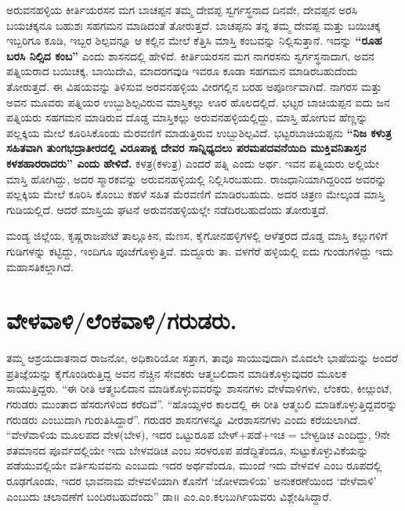 ಅರುವನಹಳ್ಳಿಯ ಕೀರ್ತಿಯರಸನ ಮಗ ಬಾಚಪ್ಪನ ತಮ್ಮ ದೇವಪ್ಪ ಸ್ವರ್ಗಸ್ಥನಾದ ದಿನವೇ, ದೇವಪ್ಪನ ಅರಸಿ ಬಯಚಕ್ಕನೂ ಬಹುಶಃ ಸಹಗಮನ ಮಾಡಿದಂತೆ ತೋರುತ್ತದೆ. ಬಾಚಪ್ಪನು ತನ್ನ ತಮ್ಮ ದೇವಪ್ಪ ಮತ್ತು ಬಯಿಚಕ್ಕ ಇಬ್ಬರಿಗೂ ಕೂಡಿ, ಇಬ್ಬರ ಶಿಲ್ಪವನ್ನೂ ಆ ಕಲ್ಲಿನ ಮೇಲೆ ಕೆತ್ತಿಸಿ ಮಾಸ್ತಿ ಕಂಬವನ್ನು ನಿಲ್ಲಿಸುತ್ತಾನೆ. ಇದನ್ನು \textbf{“ರೂಹ ಬರಸಿ ನಿಲ್ಸಿದ ಕಂಬ”} ಎಂದು ಶಾಸನದಲ್ಲಿ ಹೇಳಿದೆ. ಕೀರ್ತಿಯರಸನ ಮಗ ನಾಗರಸನು ಸ್ವರ್ಗಸ್ಥನಾದಾಗ, ಅವನ ಪತ್ನಿಯರಾದ ಬಯಿಚಕ್ಕ, ಬಾಯಿದೇವಿ, ಮಾದರಗವುಡಿ ಇವರೂ ಕೂಡಾ ಸಹಗಮನ ಮಾಡಿರಬಹುದೆಂದು ತೋರುತ್ತದೆ. ಈ ವಿಷಯವನ್ನು ತಿಳಿಸುವ ಅರವನಹಳ್ಳಿಯ ವೀರಗಲ್ಲಿನ ಬರಹ ಅಪೂರ್ಣವಾಗಿದೆ. ನಾಗರಸ ಮತ್ತು ಅವನ ಮೂವರು ಪತ್ನಿಯರ ಉಬ್ಬುಶಿಲ್ಪವಿರುವ ಮಾಸ್ತಿಕಲ್ಲು ಊರ ಹೊಲದಲ್ಲಿದೆ. ಭಟ್ಟರ ಬಾಚಿಯಪ್ಪನ ಐದು ಜನ ಪತ್ನಿಯರು ಸಹಗಮನ ಮಾಡಿರುವ ದೊಡ್ಡ ಮಾಸ್ತಿಕಲ್ಲು ಅರುವನಹಳ್ಳಿಯಲ್ಲಿದ್ದು, ಮಾಸ್ತಿ ಹೋಗುವ ಹೆಣ್ಣನ್ನು ಪಲ್ಲಕ್ಕಿಯ ಮೇಲೆ ಕೂರಿಸಿಕೊಂಡು ಮೆರವಣಿಗೆ ಮಾಡುತ್ತಿರುವ ಉಬ್ಬುಶಿಲ್ಪವಿದೆ. ಭಟ್ಟರಬಾಚಿಯಪ್ಪನು \textbf{“ನಿಜ ಕಳುತ್ರ ಸಹಿತವಾಗಿ ತುಂಗಭದ್ರಾತೀರದಲ್ಲಿ ವಿರೂಪಾಕ್ಷ ದೇವರ ಸಾನ್ನಿಧ್ಯದಲು ಪರಮಪದವನೆಯಿದಿ ಮುಕ್ತಿವನಿತಾಸ್ತನ ಕಳಶಹಾರರಾದರು” ಎಂದು ಹೇಳಿದೆ.} ಕಳತ್ರ(ಕಳುತ್ರ) ಎಂದರೆ ಪತ್ನಿ ಎಂದು ಅರ್ಥ. ಇವನ ಪತ್ನಿಯರು ಅಲ್ಲಿಯೇ ಮಾಸ್ತಿ ಹೋಗಿದ್ದು, ಅದರ ಸ್ಮಾರಕವನ್ನು ಅರುವನಹಳ್ಳಿಯಲ್ಲಿ ನಿಲ್ಲಿಸಿರಬಹುದು. ರಾಜಧಾನಿಯಾಗಿದ್ದರಿಂದ ಅವರನ್ನು ಪಲ್ಲಕ್ಕಿಯ ಮೇಲೆ ಕೂರಿಸಿ ಕೊಂಬು ಕಹಳೆ ಸಹಿತ ಮೆರವಣಿಗೆ ಮಾಡಿರಬಹುದು. ಅದರ ಚಿತ್ರಣ ಮೇಲ್ಕಂಡ ಮಾಸ್ತಿ ಗುಡಿಯಲ್ಲಿದೆ. ಆದರೆ ಮಾಸ್ತಿಯ ಘಟನೆ ಅರುವನಹಳ್ಳಿಯಲ್ಲೇ ನಡೆದಿರಬಹುದೆಂದು ತೋರುತ್ತದೆ.

ಮಂಡ್ಯ ಜಿಲ್ಲೆಯ, ಕೃಷ್ಣರಾಜಪೇಟೆ ತಾಲ್ಲೂಕಿನ, ಮೆಣಸ, ಕೈಗೋನಹಳ್ಳಿಗಳಲ್ಲಿ ಆಳೆತ್ತರದ ದೊಡ್ಡ ಮಾಸ್ತಿ ಕಲ್ಲುಗಳಿಗೆ ಗುಡಿಗಳನ್ನು ಕಟ್ಟಿದ್ದು, ಇಂದಿಗೂ ಪೂಜೆಗೊಳ್ಳುತ್ತಿವೆ. ಮದ್ದೂರು ತಾ. ವಳಗೆರೆ ಹಳ್ಳಿಯಲ್ಲಿ ಐದು ಗುಂಡುಗಳಿದ್ದು ಇದು ಮಹಾಸತಿಕಲ್ಲಾಗಿದೆ.


\section*{ವೇಳವಾಳಿ/ಲೆಂಕವಾಳಿ/ಗರುಡರು.}

ತಮ್ಮ ಆಶ್ರಯದಾತನಾದ ರಾಜನೋ, ಅಧಿಕಾರಿಯೋ ಸತ್ತಾಗ, ತಾವೂ ಸಾಯುವುದಾಗಿ ಮೊದಲೇ ಭಾಷೆಯನ್ನು ಅಂದರೆ ಪ್ರತಿಜ್ಞೆಯನ್ನು ಕೈಗೊಂಡಿರುತ್ತಿದ್ದ ಅವನ ನೆಚ್ಚಿನ ಸೇವಕರು ಆತ್ಮಬಲಿದಾನ ಮಾಡಿಕೊಳ್ಳುವುದರ ಮೂಲಕ ಸಾಯುತ್ತಿದ್ದರು. “ಈ ರೀತಿ ಆತ್ಮಬಲಿದಾನ ಮಾಡಿಕೊಳ್ಳುವವರನ್ನು ಶಾಸನಗಳು ವೇಳೆವಾಳಿಗಳು, ಲೆಂಕರು, ಕೀೞ್ಗುಂಟೆ, ಗರುಡರು ಮುಂತಾದ ಹೆಸರುಗಳಿಂದ ಕರೆದಿವೆ”. “ಹೊಯ್ಸಳರ ಕಾಲದಲ್ಲಿ ಈ ರೀತಿ ಆತ್ಮಬಲಿ ಮಾಡಿಕೊಳ್ಳುತ್ತಿದ್ದವರನ್ನು ಗರುಡರು ಎಂಬುದಾಗಿ ಗುರುತಿಸಿದ್ದಾರೆ”. ಗರುಡರ ಶಾಸನಗಳನ್ನೂ ವೀರಶಾಸನಗಳು ಎಂದು ಕರೆಯಲಾಗಿದೆ. “ವೇಳೆವಾಳಿಯ ಮೂಲಪದ ವೇಳ(ಬೇಳ), ಇದರ ಒಟ್ಟುರೂಪ ಬೇಳ್​+ಪಡೆ+ಇಚ = ಬೇಳ್ವಡಿಚ ಎಂದಿದ್ದು, 9ನೇ ಶತಮಾನದ ಪೂರ್ವದಲ್ಲಿಯೇ ಇದು ಬೇಳವಡಿಚ ಎಂಬ ಸರಳರೂಪ ಪಡೆದ್ದಿತೆಂದೂ, ಸುಟ್ಟುಕೊಳ್ಳುವಿಕೆಯನ್ನು ಪಡೆಯುವಲ್ಲಿಯೇ ವರ್ತಿಸುವವನು ಎಂಬುದು ಇದರ ಅರ್ಥವೆಂದೂ, ಮುಂದೆ ಇದು ವೇಳವಳ ಎಂಬ ರೂಪದಲ್ಲಿ ರೂಢಗೊಂಡು, ಇದರ ಭಾವನಾಮ ವೇಳವಳಿಯಾಗಿ ಕೊನೆಗೆ ‘ಜೋಳವಾಳಿಯ’ ಅನುಕರಣೆಯಿಂದ ‘ವೇಳೆವಾಳಿ’ ಎಂಬುದು ಚಲಾವಣೆಗೆ ಬಂದಿರಬಹುದೆಂದು” ಡಾ॥ ಎಂ.ಎಂ.ಕಲಬುರ್ಗಿಯವರು ವಿಶ್ಲೇಷಿಸಿದ್ದಾರೆ.

